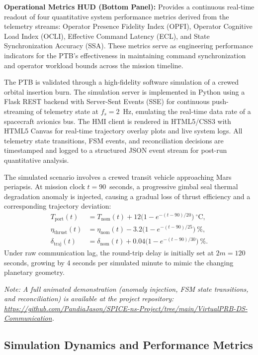 \documentclass[ASNA,twocolumn]{USG}
\begin{document}
\textbf{Operational Metrics HUD (Bottom Panel):} Provides a continuous real-time readout
of four quantitative system performance metrics derived from the telemetry streams:
Operator Presence Fidelity Index (OPFI), Operator Cognitive Load Index (OCLI),
Effective Command Latency (ECL), and State Synchronization Accuracy (SSA).
These metrics serve as engineering performance indicators for the PTB's effectiveness in
maintaining command synchronization and operator workload bounds across the mission timeline.

The PTB is validated through a high-fidelity software simulation of a crewed orbital insertion
burn. The simulation server is implemented in Python using a Flask REST backend with Server-Sent
Events (SSE) for continuous push-streaming of telemetry state at \(f_s = 2\)~Hz, emulating the
real-time data rate of a spacecraft avionics bus. The HMI client is rendered in HTML5/CSS3 with
HTML5 Canvas for real-time trajectory overlay plots and live system logs. All telemetry state
transitions, FSM events, and reconciliation decisions are timestamped and logged to a structured
JSON event stream for post-run quantitative analysis.

The simulated scenario involves a crewed transit vehicle approaching Mars periapsis. At mission clock
\(t = 90\)~seconds, a progressive gimbal seal thermal degradation anomaly is injected, causing a
gradual loss of thrust efficiency and a corresponding trajectory deviation:
\begin{align}
  T_{\text{port}}(t) &= T_{\text{nom}}(t) + 12\bigl(1 - e^{-(t-90)/20}\bigr)~^{\circ}\text{C}, \\
  \eta_{\text{thrust}}(t) &= \eta_{\text{nom}}(t) - 3.2\bigl(1 - e^{-(t-90)/25}\bigr)~\%, \\
  \delta_{\text{traj}}(t) &= \delta_{\text{nom}}(t) + 0.04\bigl(1 - e^{-(t-90)/30}\bigr)~\%.
\end{align}
Under raw communication lag, the round-trip delay is initially set at \(2m = 120\) seconds, growing
by 4 seconds per simulated minute to mimic the changing planetary geometry.


\textit{Note: A full animated demonstration (anomaly injection, FSM state transitions, and
reconciliation) is available at the project repository:
\url{https://github.com/PandiaJason/SPICE-ns-Project/tree/main/VirtualPRB-DS-Communication}.}


\subsection{Simulation Dynamics and Performance Metrics}
\end{document}
